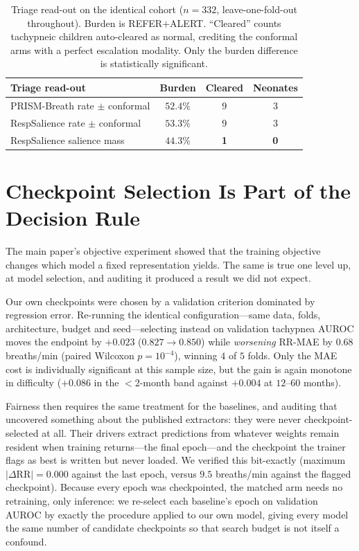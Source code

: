 \begin{table}[!t]
\caption{Triage read-out on the identical cohort ($n{=}332$, leave-one-fold-out throughout). Burden is
REFER$+$ALERT. ``Cleared'' counts tachypneic children auto-cleared as normal, crediting the conformal
arms with a perfect escalation modality. Only the burden difference is statistically significant.}
\label{tab:disttriage}\centering\small
\setlength{\tabcolsep}{4pt}
\begin{tabular}{@{}lccc@{}}\toprule
Triage read-out & Burden & Cleared & Neonates\\\midrule
PRISM-Breath rate $\pm$ conformal & $52.4\%$ & 9 & 3\\
RespSalience rate $\pm$ conformal & $53.3\%$ & 9 & 3\\
RespSalience salience mass & $\mathbf{44.3\%}$ & \textbf{1} & \textbf{0}\\\bottomrule
\end{tabular}
\end{table}



\section{Checkpoint Selection Is Part of the Decision Rule}
\label{sec:selmatrix}
The main paper's objective experiment showed that the training objective changes which model a fixed
representation yields. The same is true one level up, at model selection, and auditing it produced a
result we did not expect.

Our own checkpoints were chosen by a validation criterion dominated by regression error. Re-running the
identical configuration---same data, folds, architecture, budget and seed---selecting instead on
validation tachypnea AUROC moves the endpoint by ${+}0.023$ ($0.827\rightarrow0.850$) while
\emph{worsening} RR-MAE by $0.68$ breaths/min (paired Wilcoxon $p=10^{-4}$), winning $4$ of $5$ folds.
Only the MAE cost is individually significant at this sample size, but the gain is again monotone in
difficulty (${+}0.086$ in the $<$2-month band against ${+}0.004$ at $12$--$60$ months).

Fairness then requires the same treatment for the baselines, and auditing that uncovered something
about the published extractors: they were never checkpoint-selected at all. Their drivers extract
predictions from whatever weights remain resident when training returns---the final epoch---and the
checkpoint the trainer flags as best is written but never loaded. We verified this bit-exactly
(maximum $|\Delta\mathrm{RR}|=0.000$ against the last epoch, versus $9.5$ breaths/min against the
flagged checkpoint). Because every epoch was checkpointed, the matched arm needs no retraining, only
inference: we re-select each baseline's epoch on validation AUROC by exactly the procedure applied to
our own model, giving every model the same number of candidate checkpoints so that search budget is not
itself a confound.

